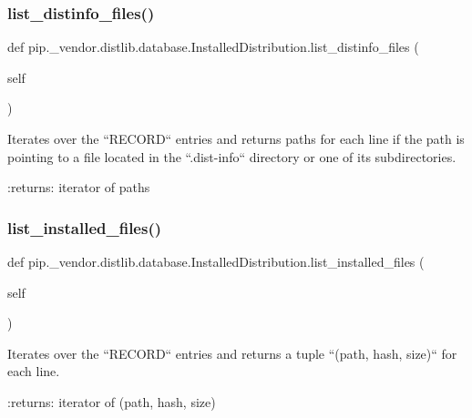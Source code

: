 \subsubsection{\texorpdfstring{list\+\_\+distinfo\+\_\+files()}{list\_distinfo\_files()}}
{\footnotesize\ttfamily def pip.\+\_\+vendor.\+distlib.\+database.\+Installed\+Distribution.\+list\+\_\+distinfo\+\_\+files (\begin{DoxyParamCaption}\item[{}]{self }\end{DoxyParamCaption})}

\begin{DoxyVerb}Iterates over the ``RECORD`` entries and returns paths for each line if
the path is pointing to a file located in the ``.dist-info`` directory
or one of its subdirectories.

:returns: iterator of paths
\end{DoxyVerb}
 \mbox{\label{classpip_1_1__vendor_1_1distlib_1_1database_1_1InstalledDistribution_ac8334af46ee0a8db7654afeba7951647}} 
\subsubsection{\texorpdfstring{list\+\_\+installed\+\_\+files()}{list\_installed\_files()}}
{\footnotesize\ttfamily def pip.\+\_\+vendor.\+distlib.\+database.\+Installed\+Distribution.\+list\+\_\+installed\+\_\+files (\begin{DoxyParamCaption}\item[{}]{self }\end{DoxyParamCaption})}

\begin{DoxyVerb}Iterates over the ``RECORD`` entries and returns a tuple
``(path, hash, size)`` for each line.

:returns: iterator of (path, hash, size)
\end{DoxyVerb}
 \mbox{\label{classpip_1_1__vendor_1_1distlib_1_1database_1_1InstalledDistribution_ab51f5d36c452fdda77b5c98316f2b831}} 
